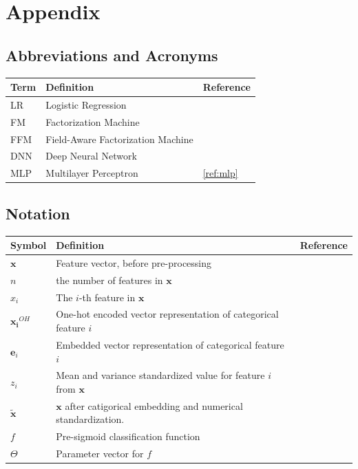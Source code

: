 \documentclass{mldsmsc}
\begin{document}
\appendix
%
\chapter{Appendix}

\section{Abbreviations and Acronyms}
\label{app:acronyms}

\begin{table}[ht]
    \begin{tabular}{|l|l|l|}
      \hline
        \textbf{Term} & \textbf{Definition} & \textbf{Reference} \\
      \hline
        LR& Logistic Regression & \\
        FM & Factorization Machine & \\
        FFM & Field-Aware Factorization Machine & \\
        DNN & Deep Neural Network & \\
        MLP & Multilayer Perceptron & \ref{ref:mlp} \\
    \hline
    \end{tabular}
\end{table}


\section{Notation}
\label{app:notation}

\begin{table}[ht]
    \begin{tabular}{|l|l|l|}
      \hline
        \textbf{Symbol} & \textbf{Definition} & \textbf{Reference} \\
      \hline
        $\mathbf{x}$& Feature vector, before pre-processing &\\
        $n$ & the number of features in $\mathbf{x}$ &\\
        $x_i$& The $i$-th feature in $\mathbf{x}$ &\\
        $\mathbf{x_i}^{OH}$ & One-hot encoded vector representation of categorical feature $i$ &\\
        $\mathbf{e}_i$ & Embedded vector representation of categorical feature $i$ & \\
        $z_i$ & Mean and variance standardized value for feature $i$ from $\mathbf{x}$ &\\
        $\tilde{\mathbf{x}}$ & $\mathbf{x}$ after catigorical embedding and numerical standardization. &\\
        $f$ & Pre-sigmoid classification function &\\
        $\Theta$ & Parameter vector for $f$ & \\
    \hline
    \end{tabular}
\end{table}




\end{document}
